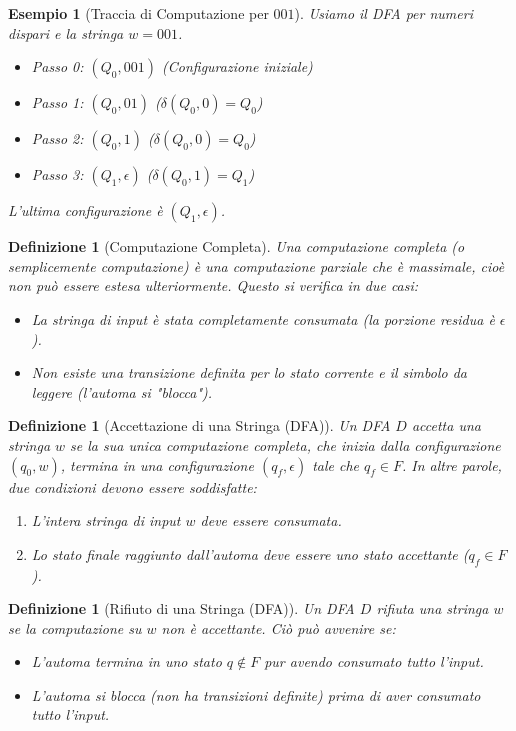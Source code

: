 \documentclass[a4paper, 11pt]{book} %
\newtheorem{definition}[theorem]{Definizione}
\newtheorem{example}[theorem]{Esempio}
\theoremstyle{definition}
\begin{document}
\begin{example}[Traccia di Computazione per $001$]
Usiamo il DFA per numeri dispari e la stringa $w = 001$.
\begin{itemize}
    \item Passo 0: $(Q_0, 001)$ \quad (Configurazione iniziale)
    \item Passo 1: $(Q_0, 01)$ \quad ($\delta(Q_0, 0) = Q_0$)
    \item Passo 2: $(Q_0, 1)$ \quad ($\delta(Q_0, 0) = Q_0$)
    \item Passo 3: $(Q_1, \epsilon)$ \quad ($\delta(Q_0, 1) = Q_1$)
\end{itemize}
L'ultima configurazione è $(Q_1, \epsilon)$.
\end{example}

\begin{definition}[Computazione Completa]
Una \emph{computazione completa} (o semplicemente \emph{computazione}) è una computazione parziale che è massimale, cioè non può essere estesa ulteriormente. Questo si verifica in due casi:
\begin{itemize}
    \item La stringa di input è stata completamente consumata (la porzione residua è $\epsilon$).
    \item Non esiste una transizione definita per lo stato corrente e il simbolo da leggere (l'automa si "blocca").
\end{itemize}
\end{definition}

\begin{definition}[Accettazione di una Stringa (DFA)]
Un DFA $D$ \emph{accetta} una stringa $w$ se la sua unica computazione completa, che inizia dalla configurazione $(q_0, w)$, termina in una configurazione $(q_f, \epsilon)$ tale che $q_f \in F$.
In altre parole, due condizioni devono essere soddisfatte:
\begin{enumerate}
    \item L'intera stringa di input $w$ deve essere consumata.
    \item Lo stato finale raggiunto dall'automa deve essere uno stato accettante ($q_f \in F$).
\end{enumerate}
\end{definition}

\begin{definition}[Rifiuto di una Stringa (DFA)]
Un DFA $D$ \emph{rifiuta} una stringa $w$ se la computazione su $w$ non è accettante. Ciò può avvenire se:
\begin{itemize}
    \item L'automa termina in uno stato $q \notin F$ pur avendo consumato tutto l'input.
    \item L'automa si blocca (non ha transizioni definite) prima di aver consumato tutto l'input.
\end{itemize}
\end{definition}
\end{document}
